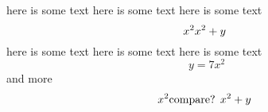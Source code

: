 here is some text here is some text here is some text
\[
	x^2 \text{$
			x^2+y
		$
	}
\]
here is some text here is some text here is some text
\[
	y=7x^2
\]
and more
\[
	x^2 \text{compare?
		$
			x^2+y
		$
	}
\]

